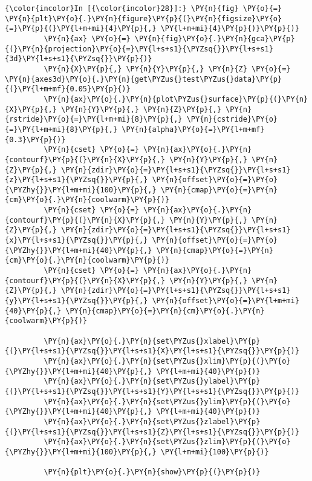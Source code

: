     \begin{Verbatim}[commandchars=\\\{\}]
{\color{incolor}In [{\color{incolor}28}]:} \PY{n}{fig} \PY{o}{=} \PY{n}{plt}\PY{o}{.}\PY{n}{figure}\PY{p}{(}\PY{n}{figsize}\PY{o}{=}\PY{p}{(}\PY{l+m+mi}{4}\PY{p}{,} \PY{l+m+mi}{4}\PY{p}{)}\PY{p}{)}
         \PY{n}{ax} \PY{o}{=} \PY{n}{fig}\PY{o}{.}\PY{n}{gca}\PY{p}{(}\PY{n}{projection}\PY{o}{=}\PY{l+s+s1}{\PYZsq{}}\PY{l+s+s1}{3d}\PY{l+s+s1}{\PYZsq{}}\PY{p}{)}
         \PY{n}{X}\PY{p}{,} \PY{n}{Y}\PY{p}{,} \PY{n}{Z} \PY{o}{=} \PY{n}{axes3d}\PY{o}{.}\PY{n}{get\PYZus{}test\PYZus{}data}\PY{p}{(}\PY{l+m+mf}{0.05}\PY{p}{)}
         \PY{n}{ax}\PY{o}{.}\PY{n}{plot\PYZus{}surface}\PY{p}{(}\PY{n}{X}\PY{p}{,} \PY{n}{Y}\PY{p}{,} \PY{n}{Z}\PY{p}{,} \PY{n}{rstride}\PY{o}{=}\PY{l+m+mi}{8}\PY{p}{,} \PY{n}{cstride}\PY{o}{=}\PY{l+m+mi}{8}\PY{p}{,} \PY{n}{alpha}\PY{o}{=}\PY{l+m+mf}{0.3}\PY{p}{)}
         \PY{n}{cset} \PY{o}{=} \PY{n}{ax}\PY{o}{.}\PY{n}{contourf}\PY{p}{(}\PY{n}{X}\PY{p}{,} \PY{n}{Y}\PY{p}{,} \PY{n}{Z}\PY{p}{,} \PY{n}{zdir}\PY{o}{=}\PY{l+s+s1}{\PYZsq{}}\PY{l+s+s1}{z}\PY{l+s+s1}{\PYZsq{}}\PY{p}{,} \PY{n}{offset}\PY{o}{=}\PY{o}{\PYZhy{}}\PY{l+m+mi}{100}\PY{p}{,} \PY{n}{cmap}\PY{o}{=}\PY{n}{cm}\PY{o}{.}\PY{n}{coolwarm}\PY{p}{)}
         \PY{n}{cset} \PY{o}{=} \PY{n}{ax}\PY{o}{.}\PY{n}{contourf}\PY{p}{(}\PY{n}{X}\PY{p}{,} \PY{n}{Y}\PY{p}{,} \PY{n}{Z}\PY{p}{,} \PY{n}{zdir}\PY{o}{=}\PY{l+s+s1}{\PYZsq{}}\PY{l+s+s1}{x}\PY{l+s+s1}{\PYZsq{}}\PY{p}{,} \PY{n}{offset}\PY{o}{=}\PY{o}{\PYZhy{}}\PY{l+m+mi}{40}\PY{p}{,} \PY{n}{cmap}\PY{o}{=}\PY{n}{cm}\PY{o}{.}\PY{n}{coolwarm}\PY{p}{)}
         \PY{n}{cset} \PY{o}{=} \PY{n}{ax}\PY{o}{.}\PY{n}{contourf}\PY{p}{(}\PY{n}{X}\PY{p}{,} \PY{n}{Y}\PY{p}{,} \PY{n}{Z}\PY{p}{,} \PY{n}{zdir}\PY{o}{=}\PY{l+s+s1}{\PYZsq{}}\PY{l+s+s1}{y}\PY{l+s+s1}{\PYZsq{}}\PY{p}{,} \PY{n}{offset}\PY{o}{=}\PY{l+m+mi}{40}\PY{p}{,} \PY{n}{cmap}\PY{o}{=}\PY{n}{cm}\PY{o}{.}\PY{n}{coolwarm}\PY{p}{)}
         
         \PY{n}{ax}\PY{o}{.}\PY{n}{set\PYZus{}xlabel}\PY{p}{(}\PY{l+s+s1}{\PYZsq{}}\PY{l+s+s1}{X}\PY{l+s+s1}{\PYZsq{}}\PY{p}{)}
         \PY{n}{ax}\PY{o}{.}\PY{n}{set\PYZus{}xlim}\PY{p}{(}\PY{o}{\PYZhy{}}\PY{l+m+mi}{40}\PY{p}{,} \PY{l+m+mi}{40}\PY{p}{)}
         \PY{n}{ax}\PY{o}{.}\PY{n}{set\PYZus{}ylabel}\PY{p}{(}\PY{l+s+s1}{\PYZsq{}}\PY{l+s+s1}{Y}\PY{l+s+s1}{\PYZsq{}}\PY{p}{)}
         \PY{n}{ax}\PY{o}{.}\PY{n}{set\PYZus{}ylim}\PY{p}{(}\PY{o}{\PYZhy{}}\PY{l+m+mi}{40}\PY{p}{,} \PY{l+m+mi}{40}\PY{p}{)}
         \PY{n}{ax}\PY{o}{.}\PY{n}{set\PYZus{}zlabel}\PY{p}{(}\PY{l+s+s1}{\PYZsq{}}\PY{l+s+s1}{Z}\PY{l+s+s1}{\PYZsq{}}\PY{p}{)}
         \PY{n}{ax}\PY{o}{.}\PY{n}{set\PYZus{}zlim}\PY{p}{(}\PY{o}{\PYZhy{}}\PY{l+m+mi}{100}\PY{p}{,} \PY{l+m+mi}{100}\PY{p}{)}
         
         \PY{n}{plt}\PY{o}{.}\PY{n}{show}\PY{p}{(}\PY{p}{)}
\end{Verbatim}


